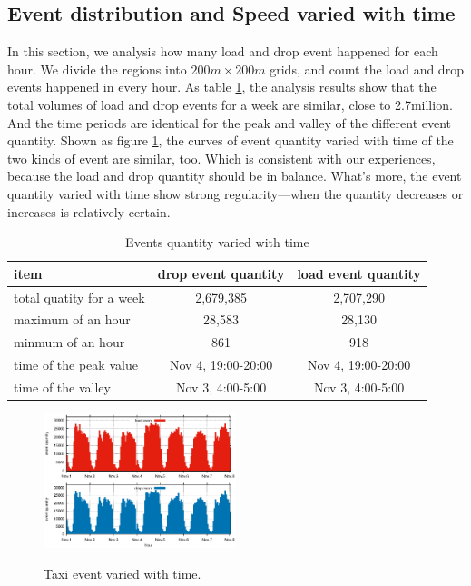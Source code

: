 \subsection{Event distribution and Speed varied with time}

In this section, we analysis how many load and drop event happened for each hour. We divide the regions into $200m\times200m$ grids, and count the load and drop events happened in every hour. As table \ref{table_event_distribution_with_time}, the analysis results show that the total volumes of load and drop events for a week are similar, close to 2.7million. And the time periods are identical for the peak and valley of the different event quantity. 
Shown as figure \ref{figure_event_varied_w_t}, the curves of event quantity varied with time of the two kinds of event are similar, too. Which is consistent  with our experiences, because the load and drop quantity should be in balance.  What’s more, the event quantity varied with time show strong regularity—when the quantity decreases or increases is relatively certain.

\begin{table}[!h]
\caption{Events quantity varied with time}\label{table_event_distribution_with_time}
\centering
\begin{tabular}{l|c|c}
 \hline
 item &drop event quantity &load event quantity \\
  \hline
  total quatity for a week& 2,679,385&2,707,290\\
  maximum of an hour&28,583 &28,130\\
  minmum of an hour&861&918\\
  time of the peak value&Nov 4, 19:00-20:00&Nov 4, 19:00-20:00\\
  time of the valley&Nov 3, 4:00-5:00&Nov 3, 4:00-5:00\\
  \hline
  \end{tabular}
\end{table}

\begin{figure}[!t]
\centering
\includegraphics[width=0.5\textwidth]{figures/analysis/event_w_time.eps}\\
\caption{Taxi event varied with time.}\label{figure_event_varied_w_t}
\end{figure}



